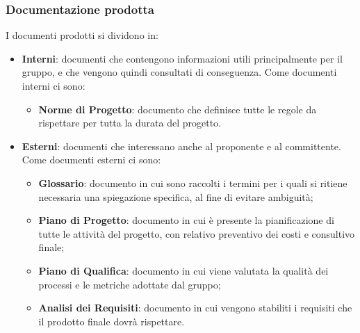 \subsubsection{Documentazione prodotta}
I documenti prodotti si dividono in:
\begin{itemize}
    \item \textbf{Interni}: documenti che contengono informazioni utili principalmente 
    per il gruppo, e che vengono quindi consultati di conseguenza. 
    Come documenti interni ci sono:
    \begin{itemize}
        \item \textbf{Norme di Progetto}: documento che definisce tutte le regole da rispettare per tutta la durata del progetto.
    \end{itemize}
    
    
    
    \item \textbf{Esterni}: documenti che interessano anche al proponente e al committente. Come documenti esterni ci sono:
    \begin{itemize}
        \item \textbf{Glossario}: documento in cui sono raccolti i termini per i quali si ritiene necessaria una spiegazione specifica, al fine di evitare ambiguità;
        \item \textbf{Piano di Progetto}: documento in cui è presente la pianificazione di tutte le attività del progetto, con relativo preventivo dei costi e consultivo finale;
        \item \textbf{Piano di Qualifica}: documento in cui viene valutata la qualità dei processi e le metriche adottate dal gruppo;
        \item \textbf{Analisi dei Requisiti}: documento in cui vengono stabiliti i requisiti che il prodotto finale dovrà rispettare.
    \end{itemize}
    
    
\end{itemize}






